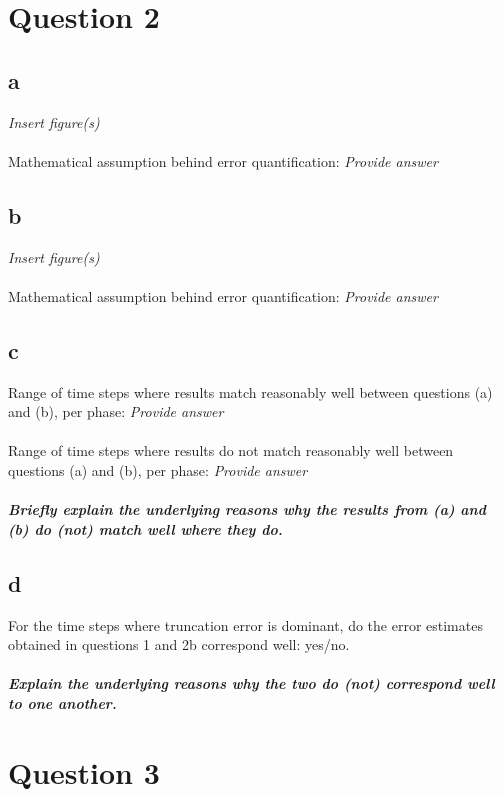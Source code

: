 \documentclass{report}
\begin{document}
\section*{Question 2}

\subsection*{a}
\textit{Insert figure(s)}\\
\\
Mathematical assumption behind error quantification: {\textit{Provide answer}}
\subsection*{b}
\textit{Insert figure(s)}\\
\\
Mathematical assumption behind error quantification: {\textit{Provide answer}}
\subsection*{c}
Range of time steps where results match reasonably well between questions (a) and (b), per phase: {\textit{Provide answer}}\\
\\
Range of time steps where results do not match reasonably well between questions (a) and (b), per phase: {\textit{Provide answer}}\\
\\
\textbf{\textit{Briefly explain the underlying reasons why the results from (a) and (b) do (not) match well where they do.}}
\subsection*{d}
For the time steps where truncation error is dominant, do the error estimates obtained in questions 1 and 2b correspond well: yes/no.\\
\\
\textbf{\textit{Explain the underlying reasons why the two do (not) correspond well to one another.}}

\clearpage
\section*{Question 3}
\end{document}
